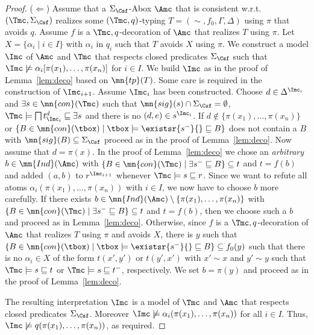 \documentclass{lmcs}
\theoremstyle{definition}
\begin{document}
\begin{proof}
\smallskip ($\Leftarrow$) Assume that a $\Sigma_{\Csf}$-Abox $\Amc$ that is
consistent w.r.t.~$(\Tmc,\Sigma_{\Csf})$ realizes some
$(\Tmc,q)$-typing $T=(\sim,f_{0},\Gamma,\Delta)$ using $\pi$ that avoids
$q$. Assume $f$ is a $\Tmc,q$-decoration of $\Amc$ that realizes $T$
using $\pi$. Let $X=\{\alpha_{i}\mid i\in I\}$ with $\alpha_{i}$ in $q_{i}$ 
such that $T$ avoids $X$ using $\pi$. We construct a model
$\Imc$ of $\Amc$ and $\Tmc$ that respects closed predicates $\Sigma_{\Csf}$
such that $\Imc\not\models \alpha_{i}[\pi(x_{1}),\ldots,\pi(x_{n})]$
for $i\in I$.  We build $\Imc$ as in the proof of Lemma~\ref{lem:deco}
based on $\mn{tp}(T)$. Some care is required in the construction of
$\Imc_{i+1}$. Assume $\Imc_{i}$ has been constructed. Choose $d \in
\Delta^{\Imc_i}$ and $\exists s \in \mn{con}(\Tmc)$ such that
$\mn{sig}(s) \cap \Sigma_{\Csf} = \emptyset$, $\Tmc \models \bigsqcap
t^d_{\Imc_i} \sqsubseteq \exists s$ and there is no $(d,e) \in
s^{\Imc_i}$. If $d\not\in \{\pi(x_{1}),\ldots,\pi(x_{n})\}$ or
$\{B\in\mn{con}(\tbox)\mid \tbox\models\existsr{s^-}{}\sqsubseteq B\}$
does not contain a $B$ with $\mn{sig}(B)\subseteq \Sigma_{\Csf}$ proceed as
in the proof of Lemma~\ref{lem:deco}.  Now assume that $d=\pi(x)$.  In
the proof of Lemma~\ref{lem:deco} we chose an \emph{arbitrary} $b\in
\mn{Ind}(\Amc)$ with $\{B \in \mn{con}(\Tmc) \mid \exists s^{-}
\sqsubseteq B\} \subseteq t$ and $t=f(b)$ and added $(a,b)$ to
$r^{\Imc_{i+1}}$ whenever $\Tmc\models s \sqsubseteq r$. Since we want
to refute all atoms $\alpha_{i}(\pi(x_{1}),\ldots,\pi(x_{n}))$ with
$i\in I$, we now have to choose $b$ more carefully.  If there exists
$b\in \mn{Ind}(\Amc)\setminus\{\pi(x_{1}),\ldots,\pi(x_{n})\}$ with
$\{B \in \mn{con}(\Tmc) \mid \exists s^{-} \sqsubseteq B\} \subseteq
t$ and $t=f(b)$, then we choose such a $b$ and proceed as in
Lemma~\ref{lem:deco}. Otherwise, since $f$ is a $\Tmc,q$-decoration of
$\Amc$ that realizes $T$ using $\pi$ and avoids $X$, there is $y$ such
that $\{B\in \mn{con}(\tbox)\mid \tbox\models\existsr{s^-}{}\sqsubseteq
B\}\subseteq f_{0}(y)$ such that there is no $\alpha_{i} \in X$ of the
form $t(x',y')$ or $t(y',x')$ with $x'\sim x$ and $y' \sim y$ such
that $\Tmc\models s\sqsubseteq t$ or $\Tmc\models s\sqsubseteq t^{-}$,
respectively.  We set $b=\pi(y)$ and proceed as in the proof of
Lemma~\ref{lem:deco}.

The resulting interpretation $\Imc$ is a model of $\Tmc$ and $\Amc$
that respects closed predicates $\Sigma_{\Csf}$. Moreover $\Imc\not\models
\alpha_{i}(\pi(x_{1}),\ldots,\pi(x_{n}))$ for all $i\in I$. Thus,
$\Imc\not\models q(\pi(x_{1}),\ldots,\pi(x_{n}))$, as required.
\end{proof}
\end{document}
